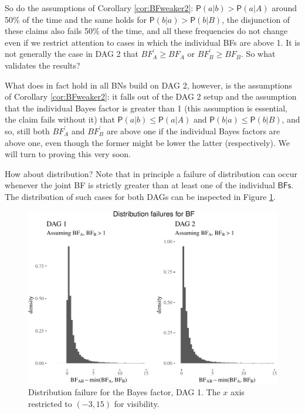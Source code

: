 \documentclass[
  10pt,
  dvipsnames,enabledeprecatedfontcommands]{scrartcl}
\newcommand{\pr}[1]{\ensuremath{\mathsf{P}(#1)}}
\begin{document}
So do the assumptions of Corollary \ref{cor:BFweaker2}:
\(\pr{a \vert b } > \pr {a \vert A}\) around 50\% of the time and the
same holds for \(\pr{b \vert a } > \pr {b \vert B}\), the disjunction of
these claims also fails 50\% of the time, and all these frequencies do
not change even if we restrict attention to cases in which the
individual \textsf{BFs} are above 1. It is not generally the case in
\textsf{DAG 2} that \(BF^{'}_{A} \geq BF_{A}\) or
\(BF^{'}_{B} \geq BF_{B}\). So what validates the results?

What does in fact hold in all \textsf{BNs} build on \textsf{DAG 2},
however, is the assumptions of Corollary \ref{cor:BFweaker2}: it falls
out of the \textsf{DAG 2} setup and the assumption that the individual
Bayes factor is greater than 1 (this assumption is essential, the claim
fails without it) that \(\pr{a \vert b} \leq \pr{a \vert A}\) and
\(\pr{b \vert a} \leq \pr{b \vert B}\), and so, still both
\(BF^{'}_{A}\) and \(BF^{'}_{B}\) are above one if the individual Bayes
factors are above one, even though the former might be lower the latter
(respectively). We will turn to proving this very soon.

How about distribution? Note that in principle a failure of distribution
can occur whenever the joint \textsf{BF} is strictly greater than at
least one of the individual \(\textsf{BFs}\). The distribution of such
cases for both DAGs can be inspected in Figure \ref{fig:BFdistr}.

\vspace{1mm}
\footnotesize

\normalsize

\begin{figure}

\begin{center}\includegraphics[width=1\linewidth]{conjunction-appendix12_files/figure-latex/plotBFDistr-1} \end{center}
\caption{Distribution failure for the Bayes factor, \textsf{DAG 1}. The $x$ axis restricted to $(-3,15)$ for visibility.}
\label{fig:BFdistr}
\end{figure}
\end{document}

